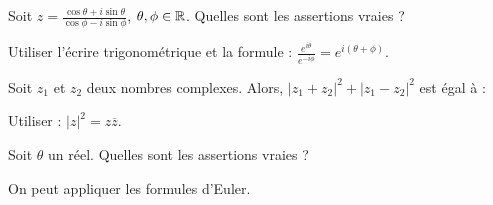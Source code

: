 \begin{question} 
Soit $z=\frac{\cos \theta + i \sin \theta}{\cos \phi - i \sin \phi}$, $\theta, \phi \in \mathbb{R}$. 
Quelles sont les assertions vraies ?
\begin{answers}

    


 
\end{answers}
\begin{explanations}
Utiliser l'écrire trigonométrique et  la formule : $\frac{e^{i\theta}}{e^{-i\phi}}= e^{i(\theta + \phi)} $.
\end{explanations}

\end{question}


\begin{question} 
Soit $z_1$ et $z_2$ deux nombres complexes. Alors, $|z_1+z_2|^2 + |z_1-z_2|^2$ est égal à : 
\begin{answers}
    


    

    

 
\end{answers}
\begin{explanations}
Utiliser :  $|z|^2= z\overline{z}$.
\end{explanations}

\end{question}

\begin{question} 
Soit $\theta$ un réel.  Quelles sont les assertions vraies ?
\begin{answers}

     
    
  

  
\end{answers}
\begin{explanations}
On peut appliquer les formules d'Euler.

\end{explanations}

\end{question}

